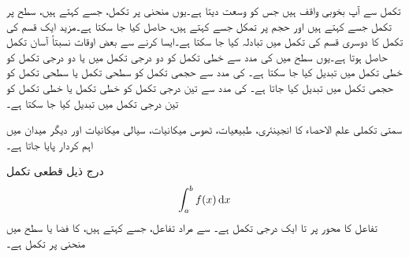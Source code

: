 تکمل سے آپ بخوبی واقف ہیں جس کو  وسعت دیتا ہے۔یوں منحنی پر تکمل، جسے  کہتے ہیں، سطح پر تکمل جسے  کہتے ہیں اور حجم پر تمکل جسے  کہتے ہیں،  حاصل کیا جا سکتا ہے۔مزید ایک قسم کی تکمل کا دوسری قسم کی تکمل میں تبادلہ کیا جا سکتا ہے۔ایسا کرنے سے بعض اوقات نسبتاً آسان تکمل حاصل ہوتا ہے۔یوں سطح میں   کی مدد سے خطی تکمل کو دو درجی تکمل میں یا دو درجی تکمل کو خطی تکمل میں تبدیل کیا جا سکتا ہے۔  کی مدد سے حجمی تکمل کو سطحی تکمل یا سطحی تکمل کو حجمی تکمل میں تبدیل کیا جاتا ہے۔ کی مدد سے تین درجی تکمل کو خطی تکمل یا خطی تکمل کو تین درجی تکمل میں تبدیل کیا جا سکتا ہے۔

سمتی تکملی علم الاحصاء کا انجینئری، طبیعیات، ٹھوس میکانیات، سیالی میکانیات اور دیگر میدان میں اہم کردار پایا جاتا ہے۔

 درج ذیل قطعی تکمل
\begin{align}\label{مساوات_سمتی_تکمل_قطعی}
\int_a^b f(x)\dif x
\end{align}
تفاعل  کا  محور پر  تا  ایک درجی تکمل ہے۔  سے مراد تفاعل، جسے  کہتے ہیں، کا فضا یا سطح میں منحنی   پر تکمل ہے۔  

